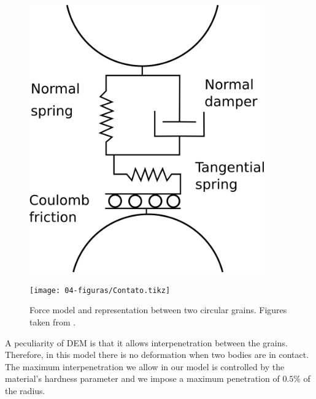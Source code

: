 \begin{figure}
    \begin{minipage}{.45\linewidth}
        \centering
        \includegraphics[width=0.9\textwidth]{04-figuras/Modelo_Forcas.png}
        \label{fig:forcas_modelo}
    \end{minipage}
    \begin{minipage}{.45\linewidth}
        \centering
        \texttt{[image: 04-figuras/Contato.tikz]}
        \label{fig:forcas_contato}
    \end{minipage}
    \caption[Contact force model.]{Force model and representation between two circular grains. Figures taken from \cite{Sands_Powders_and_Grains}.}
    \label{fig:forcas}
\end{figure}

    A peculiarity of DEM is that it allows interpenetration between the grains. Therefore, in this model there is no deformation when two bodies are in contact. The maximum interpenetration we allow in our model is controlled by the material's hardness parameter and we impose a maximum penetration of $0.5\%$ of the radius.

